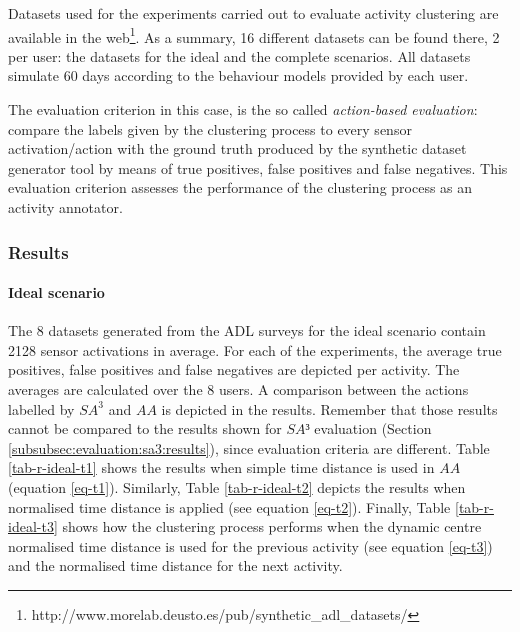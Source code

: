 Datasets used for the experiments carried out to evaluate activity clustering are available in the web\footnote{http://www.morelab.deusto.es/pub/synthetic\_adl\_datasets/}. As a summary, 16 different datasets can be found there, 2 per user: the datasets for the ideal and the complete scenarios. All datasets simulate 60 days according to the behaviour models provided by each user.

The evaluation criterion in this case, is the so called \textit{action-based evaluation}: compare the labels given by the clustering process to every sensor activation/action with the ground truth produced by the synthetic dataset generator tool by means of true positives, false positives and false negatives. This evaluation criterion assesses the performance of the clustering process as an activity annotator.

\subsubsection{Results}
\label{subsubsec:evaluation:clustering:results}

\paragraph*{Ideal scenario}

The 8 datasets generated from the ADL surveys for the ideal scenario contain 2128 sensor activations in average. For each of the experiments, the average true positives, false positives and false negatives are depicted per activity. The averages are calculated over the 8 users. A comparison between the actions labelled by $SA^3$ and $AA$ is depicted in the results. Remember that those results cannot be compared to the results shown for $SA³$ evaluation (Section \ref{subsubsec:evaluation:sa3:results}), since evaluation criteria are different. Table \ref{tab-r-ideal-t1} shows the results when simple time distance is used in $AA$ (equation \ref{eq-t1}). Similarly, Table \ref{tab-r-ideal-t2} depicts the results when normalised time distance is applied (see equation \ref{eq-t2}). Finally, Table \ref{tab-r-ideal-t3} shows how the clustering process performs when the dynamic centre normalised time distance is used for the previous activity (see equation \ref{eq-t3}) and the normalised time distance for the next activity.

